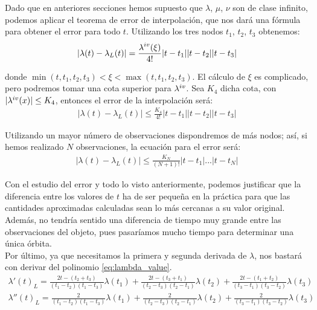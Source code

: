\documentclass[11pt]{book}
\newcommand\ddfrac[2]{\frac{\displaystyle #1}{\displaystyle #2}}
\begin{document}
Dado que en anteriores secciones hemos supuesto que $\lambda$, $\mu$, $\nu$ son de clase infinito, podemos aplicar el teorema de error de interpolación, que nos dará una fórmula para obtener el error para todo $t$. Utilizando los tres nodos $t_1$, $t_2$, $t_3$ obtenemos:
\begin{align}
|\lambda(t)-\lambda_L(t)|=\ddfrac{\lambda^{\romannumeral 4}(\xi)}{4!}|t-t_1||t-t_2||t-t_3|
\label{eq:interpolation_error}
\end{align}

\noindent donde $\min{(t,t_1,t_2,t_3)}<\xi<\max{(t,t_1,t_2,t_3)}$. El cálculo de $\xi$ es complicado, pero podremos tomar una cota superior para $\lambda^{\romannumeral 4}$. Sea $K_4$ dicha cota, con $|\lambda^{\romannumeral 4}(x)|\leq K_4$, entonces el error de la interpolación será:
\begin{align}
|\lambda(t)-\lambda_L(t)|\leq\ddfrac{K_4}{4!}|t-t_1||t-t_2||t-t_3|
\label{eq:interpolation_error_cota}
\end{align}

Utilizando un mayor número de observaciones dispondremos de más nodos; así, si hemos realizado $N$ observaciones, la ecuación para el error será:
\begin{align}
|\lambda(t)-\lambda_L(t)|\leq\ddfrac{K_N}{(N+1)!}|t-t_1|...|t-t_N|
\label{eq:interpolation_error_n_observations}
\end{align}

Con el estudio del error y todo lo visto anteriormente, podemos justificar que la diferencia entre los valores de $t$ ha de ser pequeña en la práctica para que las cantidades aproximadas calculadas sean lo más cercanas a su valor original. Además, no tendría sentido una diferencia de tiempo muy grande entre las observaciones del objeto, pues pasaríamos mucho tiempo para determinar una única órbita.\\

Por último, ya que necesitamos la primera y segunda derivada de $\lambda$, nos bastará con derivar del polinomio \eqref{eq:lambda_value}.
\begin{align*}
\lambda'(t)_L = \frac{2t-(t_2+t_3)}{(t_1-t_2)(t_1-t_3)}\lambda(t_1)
+\frac{2t-(t_3+t_1)}{(t_2-t_3)(t_2-t_1)}\lambda(t_2)
+\frac{2t-(t_1+t_2)}{(t_3-t_1)(t_3-t_2)}\lambda(t_3)\\
\lambda''(t)_L = \frac{2}{(t_1-t_2)(t_1-t_3)}\lambda(t_1)
+\frac{2}{(t_2-t_3)(t_2-t_1)}\lambda(t_2)
+\frac{2}{(t_3-t_1)(t_3-t_2)}\lambda(t_3)
\end{align*}
\end{document}
